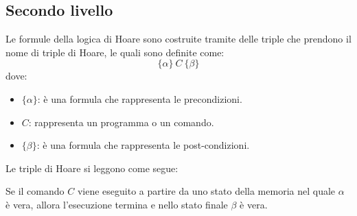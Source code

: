 \subsection{Secondo livello}
Le formule della logica di Hoare sono costruite tramite delle triple che prendono
il nome di triple di Hoare, le quali sono definite come:
\begin{equation}
    \{\alpha\} \ C \ \{\beta\}
\end{equation}
dove:
\begin{itemize}
    \item $\{\alpha\}$: è una formula che rappresenta le precondizioni.
    \item $C$: rappresenta un programma o un comando.
    \item $\{\beta\}$: è una formula che rappresenta le post-condizioni.
\end{itemize}
Le triple di Hoare si leggono come segue:
\begin{center}
    Se il comando $C$ viene eseguito a partire da uno stato della memoria nel
    quale $\alpha$ è vera, allora l'esecuzione termina e nello stato finale
    $\beta$ è vera.
\end{center}
